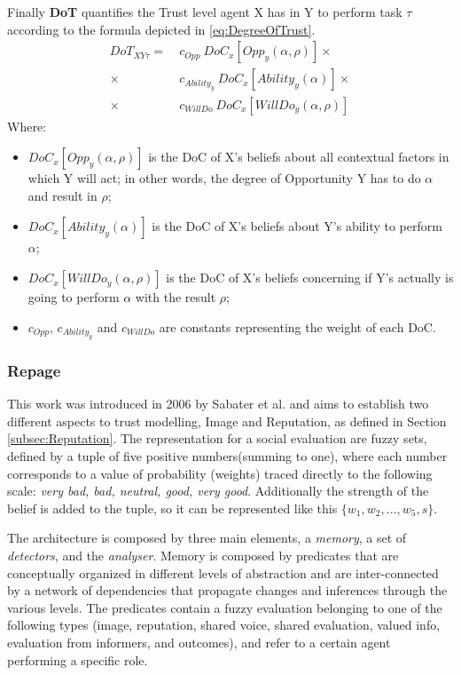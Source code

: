 Finally \textbf{\ac{DoT}} quantifies the Trust level agent X has in Y to perform task $\tau$ according to the formula depicted in \ref{eq:DegreeOfTrust}.
\begin{equation}
	\begin{aligned}
		DoT_{XY\tau} =\ &c_{Opp}\ DoC_x[Opp_y(\alpha, \rho)] \times\\
					    \times\ &c_{Ability_y}\ DoC_x[Ability_y(\alpha)]\times \\
					    \times\ &c_{WillDo}\ DoC_x[WillDo_y(\alpha, \rho)]
	\end{aligned}
	\label{eq:DegreeOfTrust}
\end{equation}
Where:
\begin{itemize}
	\item $DoC_x[Opp_y(\alpha, \rho)]$ is the \ac{DoC} of X's beliefs about all contextual factors in which Y will act; in other words, the degree of Opportunity Y has to do $\alpha$ and result in $\rho$;
	\item $DoC_x[Ability_y(\alpha)]$ is the \ac{DoC} of X's beliefs about Y's ability to perform $\alpha$;
	\item $DoC_x[WillDo_y(\alpha, \rho)]$ is the \ac{DoC} of X's beliefs concerning if Y's actually is going to perform $\alpha$ with the result $\rho$;
	\item $c_{Opp}$, $c_{Ability_y}$ and $c_{WillDo}$ are constants representing the weight of each \ac{DoC}.
\end{itemize}


\subsubsection{Repage}
\label{subsubsec:Related work:Trust Models:Repage}
This work was introduced in 2006 by Sabater et al.\cite{Sabater2006} and aims to establish two different aspects to trust modelling, Image and Reputation, as defined in Section \ref{subsec:Reputation}. The representation for a social evaluation are fuzzy sets, defined by a tuple of five positive numbers(summing to one), where each number corresponds to a value of probability (weights) traced directly to the following scale: \textit{very bad, bad, neutral, good, very good}. Additionally the strength of the belief is added to the tuple, so it can be represented like this $\{w_1, w_2, ..., w_5, s\}$.

The architecture is composed by three main elements, a \textit{memory}, a set of \textit{detectors}, and the \textit{analyser}. Memory is composed by predicates that are conceptually organized in different levels of abstraction and are inter-connected by a network of dependencies that propagate changes and inferences through the various levels. The predicates contain a fuzzy evaluation belonging to one of the following types (image, reputation, shared voice, shared evaluation, valued info, evaluation from informers, and outcomes), and refer to a certain agent performing a specific role.







